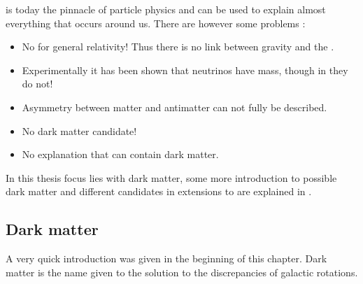 \abbrSM is today the pinnacle of particle physics and can be used to explain almost everything that occurs around us. There are however some problems \citep{Jungman:1996}:
\begin{itemize}
\item No \abbrQFT for general relativity! Thus there is no link between gravity and the \abbrSM.
\item Experimentally it has been shown that neutrinos have mass, though in \abbrSM they do not!
\item Asymmetry between matter and antimatter can not fully be described.
\item No dark matter candidate!
\item No explanation that can contain dark matter.
\end{itemize} 
In this thesis focus lies with dark matter, some more introduction to possible dark matter and different candidates in extensions to \abbrSM are explained in .


\subsection{Dark matter}\label{sec:tb:subsec:dark}
A very quick introduction was given in the beginning of this chapter. Dark matter is the name given to the solution to the discrepancies of galactic rotations. 


